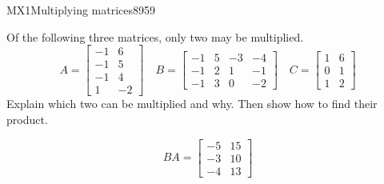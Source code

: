 \begin{exercise}{MX1}{Multiplying matrices}{8959} 
\begin{exerciseStatement} 

Of the following three matrices, only two may be multiplied. \[
          A=\left[\begin{array}{cc}
-1 & 6 \\
-1 & 5 \\
-1 & 4 \\
1 & -2
\end{array}\right] \hspace{1em} B=\left[\begin{array}{cccc}
-1 & 5 & -3 & -4 \\
-1 & 2 & 1 & -1 \\
-1 & 3 & 0 & -2
\end{array}\right] \hspace{1em} C=\left[\begin{array}{cc}
1 & 6 \\
0 & 1 \\
1 & 2
\end{array}\right]
      \] Explain which two can be multiplied and why. Then show how to find their product.

 \end{exerciseStatement}
 \begin{exerciseAnswer} \[BA=\left[\begin{array}{cc}
-5 & 15 \\
-3 & 10 \\
-4 & 13
\end{array}\right]\] \end{exerciseAnswer}
 \end{exercise}



